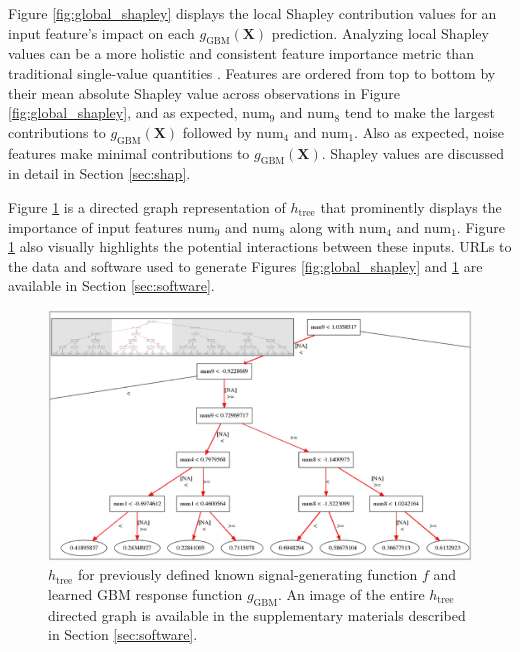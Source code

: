 \documentclass[11pt]{asaproc}
\begin{document}
Figure \ref{fig:global_shapley} displays the local Shapley contribution values for an input feature's impact on each $g_{\text{GBM}}(\mathbf{X})$ prediction. Analyzing local Shapley values can be a more holistic and consistent feature importance metric than traditional single-value quantities \cite{shapley}. Features are ordered from top to bottom by their mean absolute Shapley value across observations in Figure \ref{fig:global_shapley}, and as expected, $\text{num}_9$ and $\text{num}_8$ tend to make the largest contributions to $g_{\text{GBM}}(\mathbf{X})$ followed by $\text{num}_4$ and $\text{num}_1$. Also as expected, noise features make minimal contributions to $g_{\text{GBM}}(\mathbf{X})$. Shapley values are discussed in detail in Section \ref{sec:shap}.

Figure \ref{fig:dt_surrogate} is a directed graph representation of $h_{\text{tree}}$ that prominently displays the importance of input features $\text{num}_9$ and $\text{num}_8$ along with $\text{num}_4$ and $\text{num}_1$. Figure \ref{fig:dt_surrogate} also visually highlights the potential interactions between these inputs. URLs to the data and software used to generate Figures \ref{fig:global_shapley} and \ref{fig:dt_surrogate} are available in Section \ref{sec:software}.

\begin{figure}[htb]
	\begin{center}
		\includegraphics[scale=0.3]{img/figure_3.eps}
		\caption{$h_{\text{tree}}$ for previously defined known signal-generating function $f$ and learned GBM response function $g_{\text{GBM}}$. An image of the entire $h_{\text{tree}}$ directed graph is available in the supplementary materials described in Section \ref{sec:software}.}
		\label{fig:dt_surrogate}
	\end{center}
\end{figure}
\end{document}
